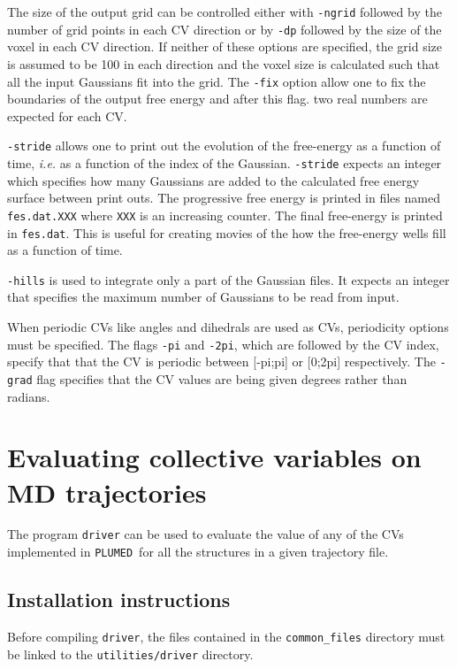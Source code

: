 \documentclass[12pt,fleqn]{report}
\newcommand{\plumed}{{\tt PLUMED}}
\begin{document}
The size of the output grid can be controlled either with {\tt -ngrid}
followed by the number of grid points in each CV direction
or by {\tt -dp} followed by the size of the voxel in each CV
direction. If neither of these options are specified, the grid
size is assumed to be 100 in each direction and the voxel size is
calculated such that all the input Gaussians fit into the grid. The {\tt -fix}
option allow one to fix the boundaries of the output free energy and after this flag. 
 two real numbers are expected for each CV.

{\tt -stride} allows one to print out the evolution of the free-energy as a
function of time, \emph{i.e.} as a function of the index of the Gaussian. 
{\tt -stride} expects an integer which specifies how many Gaussians
are added to the calculated free energy surface between print outs. The progressive free energy
is printed in files named {\tt fes.dat.XXX} where {\tt XXX} is an increasing
counter. The final free-energy is printed in {\tt fes.dat}.
This is useful for creating movies of the how the free-energy wells fill as a function of time.

{\tt -hills} is used to integrate only a part of the Gaussian files. It
expects an integer that specifies the maximum number of Gaussians to be read from input.

When periodic CVs like angles and dihedrals are used as CVs, periodicity options must be specified.
The flags {\tt -pi} and {\tt -2pi}, which are followed by the CV index, specify that
that the CV is periodic between [-pi;pi] or [0;2pi] respectively. The {\tt -grad} flag specifies that the CV values
are being given degrees rather than radians.

\section{Evaluating collective variables on MD trajectories}

The program {\tt driver} can be used to evaluate the value of any of the CVs
 implemented in \plumed \ for all the structures in a given trajectory file.

\subsection{Installation instructions}
Before compiling {\tt driver}, the files
contained in the {\tt common\_files} directory must be linked to the 
{\tt utilities/driver} directory.
\end{document}
